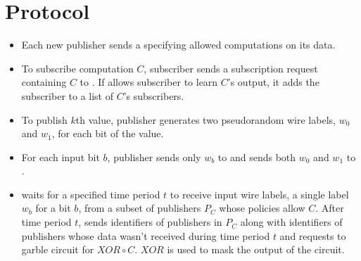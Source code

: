 \section{Protocol}
\label{sec:protocol}



\begin{figure*}[h]
\begin{mdframed}[style=myframe]

\initialize
\begin{itemize}[leftmargin=18pt,itemsep=4pt,topsep=4pt]
 
	\item Each new publisher sends \broker a \policy specifying allowed
		computations on its data.

\end{itemize}

\subscribe
\begin{itemize}[leftmargin=18pt,itemsep=4pt,topsep=4pt]

	\item To subscribe computation $C$, subscriber sends a subscription request
		containing $C$ to \broker. If \broker allows subscriber to learn $C$'s
		output, it adds the subscriber to a list of $C$'s subscribers. 

\end{itemize}

\publish
\begin{itemize}[leftmargin=18pt,itemsep=4pt,topsep=4pt,after=]
		
	\item To publish $k$th value, publisher generates two pseudorandom wire
		labels, $w_0$ and $w_1$, for each bit of the value. 
		
	\item For each input bit $b$, publisher sends only $w_b$ to \broker and sends
		both $w_0$ and $w_1$ to \garbler.

\end{itemize}

\process
\begin{itemize}[leftmargin=18pt,itemsep=4pt,topsep=4pt]

	\item \broker waits for a specified time period $t$ to receive input wire
		labels, a single label $w_b$ for a bit $b$, from a subset of publishers
		$P_C$ whose policies allow $C$. After time period $t$, \broker sends
		\garbler identifiers of publishers in $P_C$ along with identifiers of
		publishers whose data wasn't received during time period $t$ and requests
		\garbler to garble circuit for $XOR \circ C$. $XOR$ is used to mask the
		output of the circuit.


\end{itemize}
\end{mdframed}
\end{figure*}
